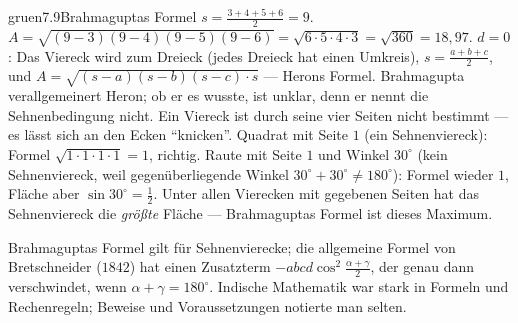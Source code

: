 \begin{loesungkarte}{gruen}{7.9}{Brahmaguptas Formel}
$s = \frac{3 + 4 + 5 + 6}2 = 9$. $A = \sqrt{(9 - 3)(9 - 4)(9 - 5)(9 - 6)} = \sqrt{6\cdot5\cdot4\cdot3} = \sqrt{360} = 18{,}97$.
$d = 0$: Das Viereck wird zum Dreieck (jedes Dreieck hat einen Umkreis), $s = \frac{a + b + c}2$, und $A = \sqrt{(s - a)(s - b)(s - c)\cdot s}$ --- Herons Formel. Brahmagupta verallgemeinert Heron; ob er es wusste, ist unklar, denn er nennt die Sehnenbedingung nicht.
Ein Viereck ist durch seine vier Seiten nicht bestimmt --- es lässt sich an den Ecken \enquote{knicken}. Quadrat mit Seite $1$ (ein Sehnenviereck): Formel $\sqrt{1\cdot1\cdot1\cdot1} = 1$, richtig. Raute mit Seite $1$ und Winkel $30^{\circ}$ (kein Sehnenviereck, weil gegenüberliegende Winkel $30^{\circ} + 30^{\circ}\neq180^{\circ}$): Formel wieder $1$, Fläche aber $\sin30^{\circ} = \frac12$. Unter allen Vierecken mit gegebenen Seiten hat das Sehnenviereck die \emph{größte} Fläche --- Brahmaguptas Formel ist dieses Maximum.
\begin{mitnehmen}\kastentext
Brahmaguptas Formel gilt für Sehnenvierecke; die allgemeine Formel von Bretschneider ($1842$) hat einen Zusatzterm $-abcd\cos^{2}\frac{\alpha + \gamma}2$, der genau dann verschwindet, wenn $\alpha + \gamma = 180^{\circ}$. Indische Mathematik war stark in Formeln und Rechenregeln; Beweise und Voraussetzungen notierte man selten.
\end{mitnehmen}
\end{loesungkarte}

